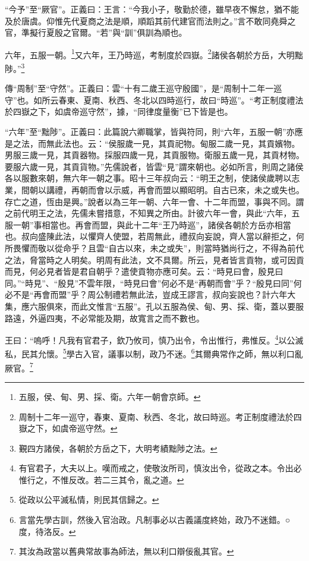{\noindent\shu{}\fzkt “今予”至“厥官”。正義曰：王言：“今我小子，敬勤於德，雖早夜不懈怠，猶不能及於唐虞。仰惟先代夏商之法是順，順蹈其前代建官而法則之。”言不敢同堯舜之官，準擬行夏殷之官爾。“若”與“訓”俱訓為順也。 \par}

六年，五服一朝。\footnote{五服，侯、甸、男、採、衛。六年一朝會京師。}又六年，王乃時巡，考制度於四嶽。\footnote{周制十二年一巡守，春東、夏南、秋西、冬北，故曰時巡。考正制度禮法於四嶽之下，如虞帝巡守然。}諸侯各朝於方岳，大明黜陟。”\footnote{覲四方諸侯，各朝於方岳之下，大明考績黜陟之法。}


{\noindent\zhuan{}\fzbyks 傳“周制”至“守然”。正義曰：雲“十有二歲王巡守殷國”，是“周制十二年一巡守”也。如所云春東、夏南、秋西、冬北以四時巡行，故曰“時巡”。“考正制度禮法於四嶽之下，如虞帝巡守然”，據，“同律度量衡”已下皆是也。 \par}

{\noindent\shu{}\fzkt “六年”至“黜陟”。正義曰：此篇說六卿職掌，皆與符同，則“六年，五服一朝”亦應是之法，而無此法也。云：“侯服歲一見，其貢祀物。甸服二歲一見，其貢嬪物。男服三歲一見，其貢器物。採服四歲一見，其貢服物。衛服五歲一見，其貢材物。要服六歲一見，其貢貨物。”先儒說者，皆雲“見”謂來朝也。必如所言，則周之諸侯各以服數來朝，無六年一朝之事。昭十三年叔向云：“明王之制，使諸侯歲聘以志業，間朝以講禮，再朝而會以示威，再會而盟以顯昭明。自古已來，未之或失也。存亡之道，恆由是興。”說者以為三年一朝、六年一會、十二年而盟，事與不同。謂之前代明王之法，先儒未嘗措意，不知異之所由。計彼六年一會，與此“六年，五服一朝”事相當也。再會而盟，與此十二年“王乃時巡”，諸侯各朝於方岳亦相當也。叔向盛陳此法，以懼齊人使盟，若周無此，禮叔向妄說，齊人當以辭拒之，何所畏懼而敬以從命乎？且雲“自古以來，未之或失”，則當時猶尚行之，不得為前代之法，脅當時之人明矣。明周有此法，文不具爾。所云，見者皆言貢物，或可因貢而見，何必見者皆是君自朝乎？遣使貢物亦應可矣。云：“時見曰會，殷見曰同。”“時見”、“殷見”不雲年限，“時見曰會”何必不是“再朝而會”乎？“殷見曰同”何必不是“再會而盟”乎？周公制禮若無此法，豈成王謬言，叔向妄說也？計六年大集，應六服俱來，而此文惟言“五服”。孔以五服為侯、甸、男、採、衛，蓋以要服路遠，外逼四夷，不必常能及期，故寬言之而不數也。 \par}

王曰：“嗚呼！凡我有官君子，欽乃攸司，慎乃出令，令出惟行，弗惟反。\footnote{有官君子，大夫以上。嘆而戒之，使敬汝所司，慎汝出令，從政之本。令出必惟行之，不惟反改。若二三其令，亂之道。}以公滅私，民其允懷。\footnote{從政以公平滅私情，則民其信歸之。}學古入官，議事以制，政乃不迷。\footnote{言當先學古訓，然後入官治政。凡制事必以古義議度終始，政乃不迷錯。○度，待洛反。}其爾典常作之師，無以利口亂厥官。\footnote{其汝為政當以舊典常故事為師法，無以利口辯佞亂其官。}


